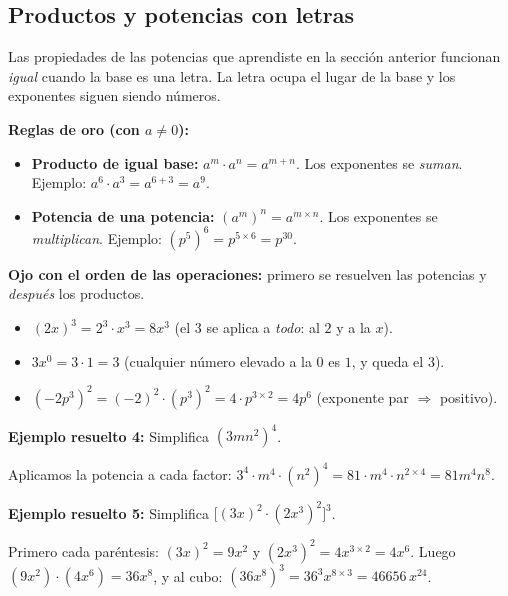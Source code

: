 \documentclass[12pt, letterpaper]{article}
\begin{document}
\subsection{Productos y potencias con letras}

Las propiedades de las potencias que aprendiste en la sección anterior funcionan \emph{igual} cuando la base es una letra. La letra ocupa el lugar de la base y los exponentes siguen siendo números.

\begin{cuadroteoria}
  \textbf{Reglas de oro (con $a \neq 0$):}
  \begin{itemize}
    \item \textbf{Producto de igual base:} $a^m \cdot a^n = a^{m+n}$. Los exponentes se \emph{suman}.
          \quad Ejemplo: $a^6 \cdot a^3 = a^{6+3} = a^9$.
    \item \textbf{Potencia de una potencia:} $(a^m)^n = a^{m \times n}$. Los exponentes se \emph{multiplican}.
          \quad Ejemplo: $(p^5)^6 = p^{5 \times 6} = p^{30}$.
  \end{itemize}
\end{cuadroteoria}

\begin{cuadroadvertencia}
  \textbf{Ojo con el orden de las operaciones:} primero se resuelven las potencias y \emph{después} los productos.
  \begin{itemize}
    \item $(2x)^3 = 2^3 \cdot x^3 = 8x^3$ (el $3$ se aplica a \emph{todo}: al $2$ y a la $x$).
    \item $3x^0 = 3 \cdot 1 = 3$ (cualquier número elevado a la $0$ es $1$, y queda el $3$).
    \item $(-2p^3)^2 = (-2)^2 \cdot (p^3)^2 = 4 \cdot p^{3 \times 2} = 4p^6$ (exponente par $\Rightarrow$ positivo).
  \end{itemize}
\end{cuadroadvertencia}

\noindent\textbf{Ejemplo resuelto 4:} Simplifica $(3mn^2)^4$.

Aplicamos la potencia a cada factor: $3^4 \cdot m^4 \cdot (n^2)^4 = 81 \cdot m^4 \cdot n^{2 \times 4} = 81m^4n^8$.

\noindent\textbf{Ejemplo resuelto 5:} Simplifica $\big[(3x)^2 \cdot (2x^3)^2\big]^3$.

Primero cada paréntesis: $(3x)^2 = 9x^2$ y $(2x^3)^2 = 4x^{3 \times 2} = 4x^6$. Luego $(9x^2) \cdot (4x^6) = 36x^8$, y al cubo: $(36x^8)^3 = 36^3 x^{8 \times 3} = 46656\, x^{24}$.
\end{document}

